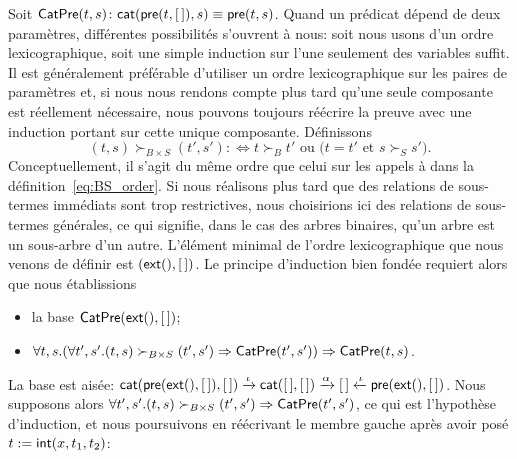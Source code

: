 Soit \(\textsf{CatPre}({t,s}) \colon \textsf{cat}(\textsf{pre}(t,[\,]),s) \equiv
\textsf{pre}(t,s)\). Quand
un prédicat dépend de deux paramètres, différentes possibilités
s'ouvrent à nous: soit nous usons d'un ordre lexicographique, soit une
simple induction sur l'une seulement des variables suffit. Il est
généralement préférable d'utiliser un ordre
lexicographique sur les paires
de paramètres et, si nous nous rendons compte plus tard qu'une seule
composante est réellement nécessaire, nous pouvons toujours réécrire
la preuve avec une induction portant sur cette unique
composante. Définissons
\begin{equation*}
(t,s) \succ_{B \times S} (t',s') :\Leftrightarrow \text{\(t \succ_{B}
    t'\) ou (\(t = t'\) et \(s \succ_{S} s'\))}.
\end{equation*}
Conceptuellement, il s'agit du même ordre que celui sur les appels à
 dans la
définition~\eqref{eq:BS_order}. Si nous réalisons plus tard que des
relations de sous-termes immédiats sont trop restrictives, nous
choisirions ici des relations de sous-termes générales, ce qui
signifie, dans le cas des arbres binaires, qu'un arbre est un
sous-arbre d'un autre. L'élément minimal de l'ordre lexicographique
que nous venons de définir est \((\textsf{ext}(),[\,])\). Le principe
d'induction bien fondée requiert alors que nous établissions
\begin{itemize}

  \item la base \(\textsf{CatPre}({\textsf{ext}(),[\,]})\);

  \item \(\forall t,s. (\forall t',s'.(t,s) \succ_{B \times S} (t',s')
    \Rightarrow \textsf{CatPre}({t',s'})) \Rightarrow
    \textsf{CatPre}({t,s})\).

\end{itemize}
La base est aisée: \(\textsf{cat}(\textsf{pre}(\textsf{ext}(),[\,]),[\,])
\xrightarrow{\smash{\iota}} \textsf{cat}([\,],[\,])
\xrightarrow{\smash{\alpha}} [\,] \xleftarrow{\smash{\iota}}
\textsf{pre}(\textsf{ext}(),[\,])\). Nous supposons
alors \(\forall t',s'.(t,s) \succ_{B \times S} (t',s') \Rightarrow
\textsf{CatPre}({t',s'})\), ce qui est l'hypothèse d'induction, et nous
poursuivons en réécrivant le membre gauche après avoir posé \(t :=
\textsf{int}(x,t_1,t_2)\):
